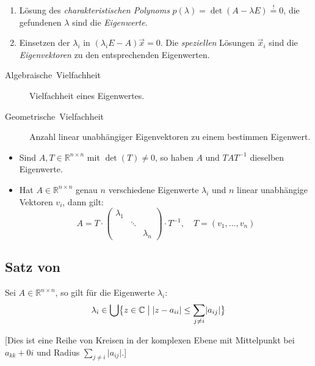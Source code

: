 \begin{enumerate}
  \item Lösung des \emph{charakteristischen Polynoms} $p(\lambda)=\det(A-\lambda E)\stackrel{!}{=}0$, die gefundenen $\lambda$ sind die \emph{Eigenwerte}.
  \item Einsetzen der $\lambda_{i}$ in $(\lambda_{i}E-A)\vec{x}=0$.
  		Die \emph{speziellen} Lösungen $\vec{x}_{i}$ sind die \emph{Eigenvektoren} zu den entsprechenden Eigenwerten.
\end{enumerate}
\begin{description}
  \item [{Algebraische~Vielfachheit}] Vielfachheit eines Eigenwertes.
  \item [{Geometrische~Vielfachheit}] Anzahl linear unabhängiger Eigenvektoren zu einem bestimmen Eigenwert.
\end{description}
\begin{itemize}
  \item Sind $A,T\in\mathbb{R}^{n\times n}$ mit $\det(T)\neq0$, so haben $A$ und $TAT^{-1}$ dieselben Eigenwerte.
  \item Hat $A\in\mathbb{R}^{n\times n}$ genau $n$ verschiedene Eigenwerte $\lambda_{i}$ und $n$ linear unabhängige Vektoren $v_{i}$, dann gilt:
	\[
	  A = T \cdot
	  \begin{pmatrix}
	    \lambda_1                     \\
		      & \ddots            \\
		      &        & \lambda_n
	  \end{pmatrix}
	  \cdot T^{-1}
	  ,\quad
	  T=(v_1, \ldots, v_n)
	\]
\end{itemize}

\subsection{\label{sub:Satz-von-Gerschgorin}Satz von \protect{}}

Sei $A\in\mathbb{R}^{n\times n}$, so gilt für die Eigenwerte $\lambda_{i}$:
\[ \lambda_{i}\in\bigcup \bigl\{ z\in\mathbb{C} \bigm| \lvert z-a_{ii} \rvert \leq \sum_{j\neq i} \lvert a_{ij} \rvert\bigr\} \]

[Dies ist eine Reihe von Kreisen in der komplexen Ebene mit Mittelpunkt bei $a_{kk}+0i$ und Radius $\sum_{j\neq i} \lvert a_{ij} \rvert$.]

